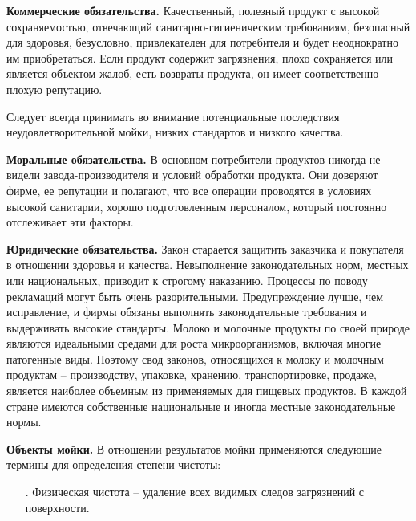 {\begin{itemize}[leftmargin=2.15cm, labelwidth=0.65cm, labelsep=0.0cm]
	\setcounter{itemcntr}{1}
\end{itemize}

\par \redline \textbf{Коммерческие обязательства.} Качественный, полезный продукт с высокой сохраняемостью, отвечающий санитарно-гигиеническим требованиям, безопасный для здоровья, безусловно, привлекателен для потребителя и будет неоднократно им приобретаться. Если продукт содержит загрязнения, плохо сохраняется или является объектом жалоб, есть возвраты продукта, он имеет соответственно плохую репутацию.

\par \redline	Следует всегда принимать во внимание потенциальные последствия неудовлетворительной мойки, низких стандартов и низкого качества.

\par \redline \textbf{Моральные обязательства.} В основном потребители продуктов никогда не видели завода-производителя и условий обработки продукта. Они доверяют фирме, ее репутации и полагают, что все операции проводятся в условиях высокой санитарии, хорошо подготовленным персоналом, который постоянно отслеживает эти факторы.

\par \redline \textbf{Юридические обязательства.} Закон старается защитить заказчика и покупателя в отношении здоровья и качества. Невыполнение законодательных норм, местных или национальных, приводит к строгому наказанию. Процессы по поводу рекламаций могут быть очень разорительными. Предупреждение лучше, чем исправление, и фирмы обязаны выполнять законодательные требования и выдерживать высокие стандарты. Молоко и молочные продукты по своей природе являются идеальными средами для роста микроорганизмов, включая многие патогенные виды. Поэтому свод законов, относящихся к молоку и молочным продуктам {--} производству, упаковке, хранению, транспортировке, продаже, является наиболее объемным из применяемых для пищевых продуктов. В каждой стране имеются собственные национальные и иногда местные законодательные нормы.


\par \redline \textbf{Объекты мойки.} В отношении результатов мойки применяются следующие термины для определения
степени чистоты:

\begin{itemize}[leftmargin=2.15cm, labelwidth=0.65cm, labelsep=0.0cm] 
	
	\item[\theitemcntr. ] Физическая чистота {--} удаление всех видимых следов загрязнений с поверхности.
	\addtocounter{itemcntr}{1}
	

\end{itemize}}
